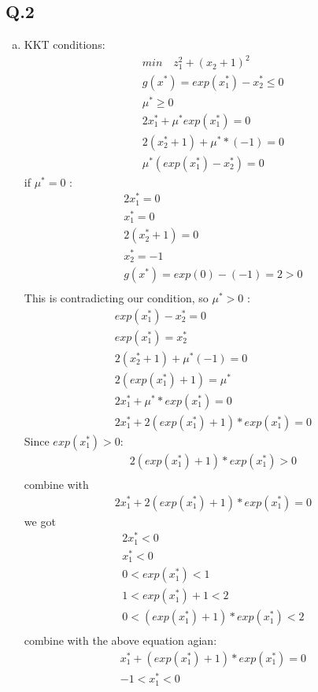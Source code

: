 \documentclass[12pt,twoside]{article}
\begin{document}
\subsection{Q.2}
\begin{enumerate}[a)]
\item
KKT conditions:
\begin{align}
min \quad z_1^2 + (x_2 + 1)^2\\
g(x^*) = exp(x_1^*) - x_2^* \leq 0\\
\mu^* \geq 0\\
2x_1^* + \mu^* exp(x_1^*) = 0\\
2(x_2^* + 1) + \mu^* * (-1) = 0\\
\mu^* (exp(x_1^*) - x_2^*) = 0
\end{align}
if $\mu^* = 0$ :
\begin{align}
2 x_1^* = 0\\
x_1^* = 0\\
2(x_2^* + 1) = 0\\
x_2^* = -1\\
g(x^*) = exp(0) - (-1) = 2 > 0\\
\end{align}
This is contradicting our condition, so $\mu^* > 0$ :
\begin{align}
exp(x_1^*) - x_2^* = 0\\
exp(x_1^*) =  x_2^*\\
2(x_2^* + 1) + \mu^* (-1) = 0\\
2(exp(x_1^*) + 1) = \mu^*\\
2x_1^* + \mu^* * exp(x_1^*) = 0\\
2x_1^* + 2(exp(x_1^*) + 1) * exp(x_1^*) = 0
\end{align}
Since $exp(x_1^*) > 0$:
\begin{align}
2(exp(x_1^*) + 1) * exp(x_1^*) > 0\\
\end{align}
combine with
\begin{align}
2x_1^* + 2(exp(x_1^*) + 1) * exp(x_1^*) = 0
\end{align}
we got
\begin{align}
2x_1^* < 0\\
x_1^* < 0\\
0 < exp(x_1^*) < 1\\
1 < exp(x_1^*) + 1 < 2\\
0 < (exp(x_1^*) + 1) * exp(x_1^*) < 2\\
\end{align}                                               
combine with the above equation agian:
\begin{align}
x_1^* + (exp(x_1^*) + 1) * exp(x_1^*) = 0\\
-1 < x_1^* < 0
\end{align}



\end{enumerate}
\end{document}
